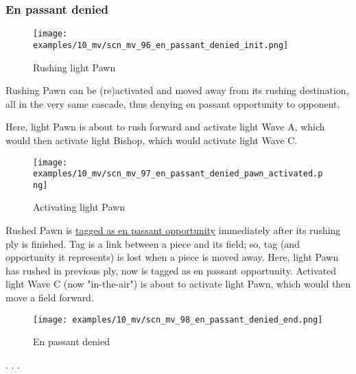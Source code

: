 \subsubsection*{En passant denied}
\label{sec:Miranda's veil/Wave/En passant/En passant denied}

\vspace*{-0.7\baselineskip}
\noindent
\begin{wrapfigure}[10]{l}{0.4\textwidth}
\centering
\texttt{[image: examples/10\_mv/scn\_mv\_96\_en\_passant\_denied\_init.png]}
\vspace*{-1.4\baselineskip}
\caption{Rushing light Pawn}
\label{fig:scn_mv_96_en_passant_denied_init}
\end{wrapfigure}
Rushing Pawn can be (re)activated and moved away from its rushing destination, all
in the very same cascade, thus denying en passant opportunity to opponent.

Here, light Pawn is about to rush forward and activate light Wave A, which would
then activate light Bishop, which would activate light Wave C.

\vspace*{1.7\baselineskip}
\noindent
\begin{wrapfigure}[13]{l}{0.4\textwidth}
\centering
\texttt{[image: examples/10\_mv/scn\_mv\_97\_en\_passant\_denied\_pawn\_activated.png]}
\vspace*{-1.4\baselineskip}
\caption{Activating light Pawn}
\label{fig:scn_mv_97_en_passant_denied_pawn_activated}
\end{wrapfigure}
Rushed Pawn is \hyperref[fig:scn_cc_09_tags_rushing]{tagged as en passant opportunity}
immediately after its rushing ply is finished. Tag is a link between a piece and its
field; so, tag (and opportunity it represents) is lost when a piece is moved away.\newline
\indent
Here, light Pawn has rushed in previous ply, now is tagged as en passant opportunity.
Activated light Wave C (now "in-the-air") is about to activate light Pawn, which would
then move a field forward.

\clearpage %

\vspace*{-2.1\baselineskip}
\noindent
\begin{wrapfigure}[1]{l}{0.4\textwidth}
\centering
\texttt{[image: examples/10\_mv/scn\_mv\_98\_en\_passant\_denied\_end.png]}
\vspace*{-1.4\baselineskip}
\caption{En passant denied}
\label{fig:scn_mv_98_en_passant_denied_end}
\end{wrapfigure}
. . .

